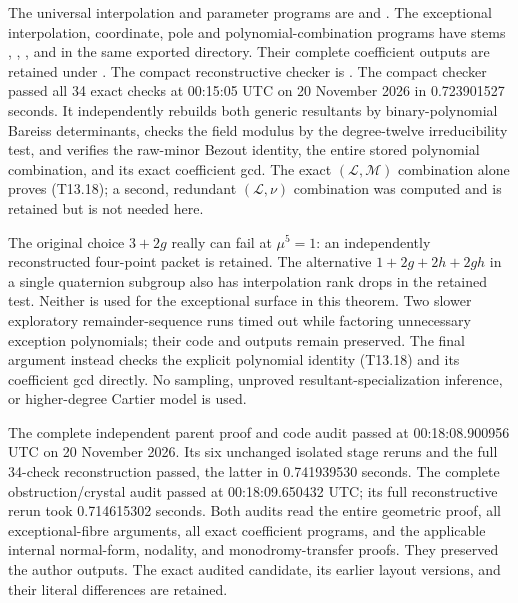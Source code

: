 \begin{remark}
\label{rem:uniform-thirteen-verification-scope-candidate}
The universal interpolation and parameter programs are
 and
.
The exceptional interpolation, coordinate, pole and polynomial-combination
programs have stems ,
,
, and
 in the same exported
directory. Their complete coefficient outputs are retained under
.
The compact reconstructive checker is
.
The compact checker passed all 34 exact checks at 00:15:05 UTC on
20 November 2026 in 0.723901527 seconds. It independently rebuilds
both generic resultants by binary-polynomial Bareiss determinants,
checks the field modulus by the degree-twelve irreducibility test,
and verifies the raw-minor Bezout identity, the entire stored
polynomial combination, and its exact coefficient gcd.
The exact $(\mathcal L,\mathcal M)$ combination alone proves (T13.18);
a second, redundant $(\mathcal L,\nu)$ combination was computed
and is retained but is not needed here.

The original choice $3+2g$ really can fail at $\mu^5=1$:
an independently reconstructed four-point packet is retained.
The alternative $1+2g+2h+2gh$ in a single quaternion subgroup also
has interpolation rank drops in the retained test. Neither is used
for the exceptional surface in this theorem. Two slower exploratory
remainder-sequence runs timed out while factoring unnecessary
exception polynomials; their code and outputs remain preserved.
The final argument instead checks the explicit polynomial identity
(T13.18) and its coefficient gcd directly. No sampling, unproved
resultant-specialization inference, or higher-degree Cartier model
is used.

The complete independent parent proof and code audit passed at
00:18:08.900956 UTC on 20 November 2026. Its six unchanged isolated
stage reruns and the full 34-check reconstruction passed, the latter
in 0.741939530 seconds. The complete obstruction/crystal audit passed
at 00:18:09.650432 UTC; its full reconstructive rerun took
0.714615302 seconds. Both audits read the entire geometric proof,
all exceptional-fibre arguments, all exact coefficient programs, and
the applicable internal normal-form, nodality, and monodromy-transfer
proofs. They preserved the author outputs. The exact audited candidate,
its earlier layout versions, and their literal differences are retained.
\end{remark}
